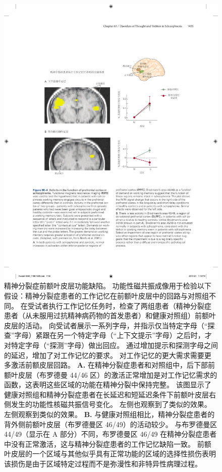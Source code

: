 \begin{figure}[htbp]
	\centering
	\includegraphics[width=1.0\linewidth]{chap60/fig_60_4}
	\caption{精神分裂症前额叶皮层功能缺陷。
		功能性磁共振成像用于检验以下假设：精神分裂症患者的工作记忆在前额叶皮层中的回路与对照组不同。
		在受试者执行工作记忆任务时，检查了两组患者（精神分裂症患者（从未服用过抗精神病药物的首发患者）和健康对照组）前额叶皮层的活动。
		向受试者展示一系列字母，并指示仅当特定字母（“探查”字母）紧跟在另一个特定字母（“上下文提示”字母）之后时，才对特定字母（“探测”字母）做出回应。
		通过增加提示和探测字母之间的延迟，增加了对工作记忆的要求。
		对工作记忆的更大需求需要更多激活前额皮层回路\cite{barch2001selective}。
		\textbf{A.} 在精神分裂症患者和对照组中，后下部前额叶皮层（布罗德曼 44/46 区）的激活正常增加是对工作记忆需求的函数，这表明这些区域的功能在精神分裂中保持完整。
		该图显示了健康对照组和精神分裂症患者在长延迟和短延迟条件下前额叶皮层右侧发生的功能性核磁共振信号变化。
		左侧也观察到了类似的效果。
		左侧观察到类似的效果。
		\textbf{B.} 与健康对照组相比，精神分裂症患者的背外侧前额叶皮层（布罗德曼区 46/49）的活动较少。
		与布罗德曼区 44/49（显示在 A 部分）不同，布罗德曼区 46/49 在精神分裂症患者中没有正常激活，这与精神分裂症患者的工作记忆缺陷一致。
		前额叶皮层的一个区域与其他似乎具有正常功能的区域的选择性损伤表明该损伤是由于区域特定过程而不是弥漫性和非特异性病理过程。}
	\label{fig:60_4}
\end{figure}


